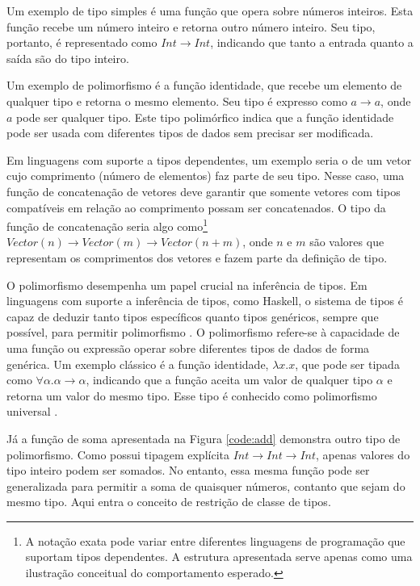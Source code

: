 Um exemplo de tipo simples é uma função que opera sobre números inteiros.
Esta função recebe um número inteiro e retorna outro número inteiro.
Seu tipo, portanto, é representado como $Int \rightarrow Int$, indicando que tanto a entrada quanto a saída são do tipo inteiro.

Um exemplo de polimorfismo é a função identidade, que recebe um elemento de qualquer tipo e retorna o mesmo elemento.
Seu tipo é expresso como $a \rightarrow a$, onde $a$ pode ser qualquer tipo.
Este tipo polimórfico indica que a função identidade pode ser usada com diferentes tipos de dados sem precisar ser modificada.

Em linguagens com suporte a tipos dependentes, um exemplo seria o de um vetor cujo comprimento (número de elementos) faz parte de seu tipo.
Nesse caso, uma função de concatenação de vetores deve garantir que somente vetores com tipos compatíveis em relação ao comprimento possam ser concatenados.
O tipo da função de concatenação seria algo como\footnote{A notação exata pode variar entre diferentes linguagens de programação que suportam tipos dependentes. A estrutura apresentada serve apenas como uma ilustração conceitual do comportamento esperado.} $Vector(n) \rightarrow Vector(m) \rightarrow Vector(n+m)$, onde $n$ e $m$ são valores que representam os comprimentos dos vetores e fazem parte da definição de tipo.

O polimorfismo desempenha um papel crucial na inferência de tipos.
Em linguagens com suporte a inferência de tipos, como Haskell, o sistema de tipos é capaz de deduzir tanto tipos específicos quanto tipos genéricos, sempre que possível, para permitir polimorfismo \cite{PIERCE2002}.
O polimorfismo refere-se à capacidade de uma função ou expressão operar sobre diferentes tipos de dados de forma genérica.
Um exemplo clássico é a função identidade, $\lambda x.x$, que pode ser tipada como $\forall \alpha. \alpha \to \alpha$, indicando que a função aceita um valor de qualquer tipo $\alpha$ e retorna um valor do mesmo tipo.
Esse tipo é conhecido como polimorfismo universal \cite{PIERCE2002}.

Já a função de soma apresentada na Figura \ref{code:add} demonstra outro tipo de polimorfismo.
Como possui tipagem explícita $Int \rightarrow Int \rightarrow Int$, apenas valores do tipo inteiro podem ser somados.
No entanto, essa mesma função pode ser generalizada para permitir a soma de quaisquer números, contanto que sejam do mesmo tipo.
Aqui entra o conceito de restrição de classe de tipos.

